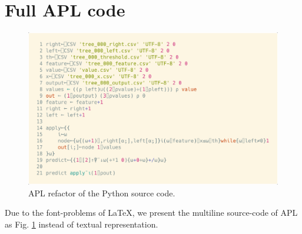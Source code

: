 \documentclass{IEEEtran}
\begin{document}
{\renewcommand*{\bibfont}{\small}\printbibliography}

\newpage

\appendix
\section{Full APL code}

\begin{figure}
  \centering
  \includegraphics[width=\columnwidth]{aplsrc.png}
  \caption{APL refactor of the Python source code.}
  \label{fig:aplsrc}
\end{figure}

Due to the font-problems of LaTeX, we present the multiline source-code of APL as Fig. \ref{fig:aplsrc} instead of textual representation.
\end{document}
